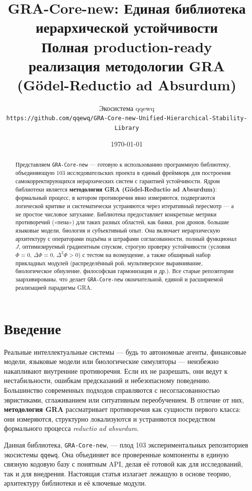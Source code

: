 \documentclass[11pt,a4paper]{article}
\title{\textbf{GRA-Core-new: Единая библиотека иерархической устойчивости}\\[3mm]
\large Полная production-ready реализация методологии GRA (Gödel-Reductio ad Absurdum)}
\author{Экосистема qqewq \\
\texttt{https://github.com/qqewq/GRA-Core-new-Unified-Hierarchical-Stability-Library}}
\date{\today}
\begin{document}
\maketitle

\begin{abstract}
Представляем \texttt{GRA-Core-new} --- готовую к использованию программную библиотеку, объединяющую 103 исследовательских проекта в единый фреймворк для построения самокорректирующихся иерархических систем с гарантией устойчивости. Ядром библиотеки является \textbf{методология GRA (Gödel-Reductio ad Absurdum)}: формальный процесс, в котором противоречия явно измеряются, подвергаются логической критике и систематически устраняются через итеративный пересмотр --- а не простое числовое затухание. Библиотека предоставляет конкретные метрики противоречий («пена») для таких разных областей, как банки, рои дронов, большие языковые модели, биология и субъективный опыт. Она включает иерархическую архитектуру с операторами подъёма и штрафами согласованности, полный функционал $J$, оптимизируемый градиентным спуском, строгую проверку устойчивости (условия $\Phi=0$, $\Delta\Phi=0$, $\Delta^2\Phi>0$) с тестом на возмущение, а также обширный набор прикладных модулей (распределённый рой, мультиверсное выравнивание, биологическое обнуление, философская гармонизация и др.). Все старые репозитории заархивированы, что делает \texttt{GRA-Core-new} окончательной, единой и расширяемой реализацией парадигмы GRA.
\end{abstract}

\section{Введение}
Реальные интеллектуальные системы --- будь то автономные агенты, финансовые модели, языковые модели или биологические симуляторы --- неизбежно накапливают внутренние противоречия. Если их не разрешать, они ведут к нестабильности, ошибкам предсказаний и небезопасному поведению. Большинство современных подходов справляются с несогласованностью эвристиками, сглаживанием или ситуативным переобучением. В отличие от них, \textbf{методология GRA} рассматривает противоречия как сущности первого класса: они измеряются, структурно локализуются и устраняются посредством формального процесса \textit{reductio ad absurdum}.

Данная библиотека, \texttt{GRA-Core-new}, --- плод 103 экспериментальных репозиториев экосистемы \texttt{qqewq}. Она объединяет все проверенные компоненты в единую связную кодовую базу с понятным API, делая её готовой как для исследований, так и для внедрения. Настоящая статья излагает лежащую в основе теорию, архитектуру библиотеки и её ключевые модули.
\end{document}
